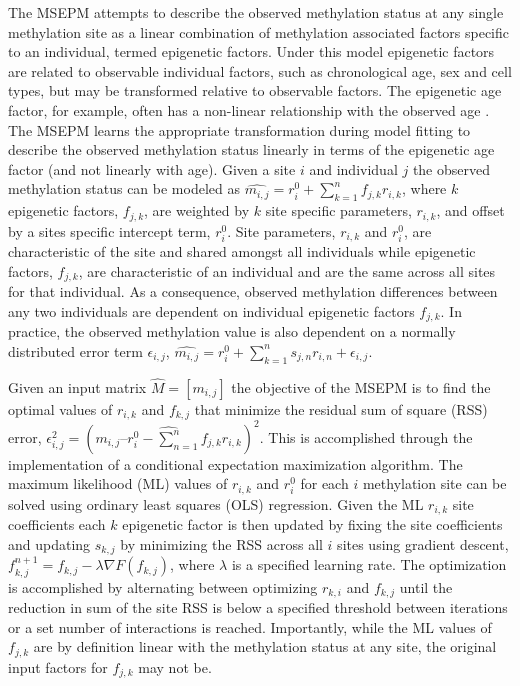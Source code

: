 \documentclass{article}
\begin{document}
{\begin{linenumbers}
The MSEPM attempts to describe the observed methylation status at any single methylation site as a linear combination 
of methylation associated factors specific to an individual, termed epigenetic factors. Under this model epigenetic 
factors are related to observable individual factors, such as chronological age, sex and cell types, but may be 
transformed relative to observable factors. The epigenetic age factor, for example, often has a non-linear 
relationship with the observed age \cite{Snir2019-ii}. The MSEPM learns the appropriate transformation during model 
fitting to describe the observed methylation status linearly in terms of the epigenetic age factor 
(and not linearly with age). Given a site $i$ and individual $j$ the observed methylation status can be 
modeled as $\hat{m_{i,j}} = r^0_i + \sum^n_{k=1} f_{j,k} r_{i,k}$, where $k$ epigenetic factors, $f_{j,k}$, 
are weighted by $k$ site specific parameters, $r_{i,k}$, and offset by a sites specific intercept term, $r^0_i$. 
Site parameters, $r_{i,k}$ and $r^0_i$, are characteristic of the site and shared amongst all individuals while 
epigenetic factors, $f_{j,k}$, are characteristic of an individual and are the same across all sites for that 
individual. As a consequence, observed methylation differences between any two individuals are dependent on 
individual epigenetic factors $f_{j,k}$. In practice, the observed methylation value is also dependent on a 
normally distributed error term 
$\epsilon_{i,j}$, $\hat{m_{i,j}} = r^0_i + \sum^n_{k=1} s_{j,n} r_{i,n} + \epsilon_{i,j}$. 

Given an input matrix $\hat{M} = [m_{i,j}]$ the objective of the MSEPM is to find the optimal values of 
$r_{i,k}$ and $f_{k,j}$ that minimize the  residual sum of square (RSS) error, 
$\epsilon_{i,j}^2 = (\hat{m_{i,j} – r^0_{i} - \sum^n_{n=1} f_{j,k} r_{i,k} })^2$. This is 
accomplished through the implementation of a conditional expectation maximization algorithm. The 
maximum likelihood (ML) values of $r_{i,k}$ and $r^0_i$ for each $i$ methylation site can be solved 
using ordinary least squares (OLS) regression. Given the ML $r_{i,k}$ site coefficients each $k$ epigenetic 
factor is then updated by fixing the site coefficients and updating $s_{k,j}$ by minimizing the RSS across 
all $i$ sites using gradient descent, $f_{k,j}^{n+1} = f_{k,j} - \lambda \nabla F(f_{k,j})$, where $\lambda$ 
is a specified learning rate. The optimization is accomplished by alternating between optimizing $r_{k,i}$ and 
$f_{k,j}$ until the reduction in sum of the site RSS is below a specified threshold between iterations or a set 
number of interactions is reached. Importantly, while the ML values of $f_{j,k}$ are by definition linear with 
the methylation status at any site, the original input factors for $f_{j,k}$ may not be. 


\end{linenumbers}}
\end{document}
